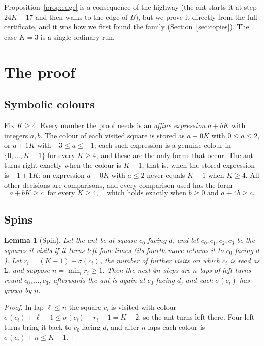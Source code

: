 \documentclass[11pt,a4paper]{article}
\newtheorem{lemma}[theorem]{Lemma}
\theoremstyle{definition}
\theoremstyle{remark}
\newcommand{\Lw}{\mathtt{L}}
\begin{document}
Proposition~\ref{prop:edge} is a consequence of the highway (the ant starts it at step $24K - 17$ and then
walks to the edge of $B$), but we prove it directly from the full certificate, and it was how we first found
the family (Section~\ref{sec:copies}). The case $K = 3$ is a single ordinary run.

\section{The proof}\label{sec:proof}

\subsection{Symbolic colours}

Fix $K \ge 4$. Every number the proof needs is an \emph{affine expression} $a + bK$ with integers $a, b$. The
colour of each visited square is stored as $a + 0K$ with $0 \le a \le 2$, or $a + 1K$ with
$-3 \le a \le -1$; each such expression is a genuine colour in $\{0, \dots, K-1\}$ for every $K \ge 4$, and
these are the only forms that occur. The ant turns right exactly when the colour is $K - 1$, that is, when the
stored expression is $-1 + 1K$: an expression $a + 0K$ with $a \le 2$ never equals $K - 1$ when $K \ge 4$.
All other decisions are comparisons, and every comparison used has the form
\[
a + bK \ge c \ \text{ for every } K \ge 4,\quad\text{which holds exactly when } b \ge 0 \text{ and } a + 4b \ge c.
\]

\subsection{Spins}

\begin{lemma}[Spin]\label{lem:spin}
Let the ant be at square $c_0$ facing $d$, and let $c_0, c_1, c_2, c_3$ be the squares it visits if it turns
left four times (its fourth move returns it to $c_0$ facing $d$). Let $r_i = (K-1) - \sigma(c_i)$, the number
of further visits on which $c_i$ is read as $\Lw$, and suppose $n = \min_i r_i \ge 1$. Then the next $4n$ steps
are $n$ laps of left turns round $c_0, \dots, c_3$; afterwards the ant is again at $c_0$ facing $d$, and each
$\sigma(c_i)$ has grown by $n$.
\end{lemma}

\begin{proof}
In lap $\ell \le n$ the square $c_i$ is visited with colour
$\sigma(c_i) + \ell - 1 \le \sigma(c_i) + r_i - 1 = K - 2$, so the ant turns left there. Four left turns bring
it back to $c_0$ facing $d$, and after $n$ laps each colour is $\sigma(c_i) + n \le K - 1$.
\end{proof}
\end{document}
